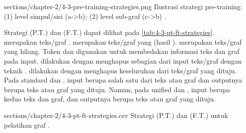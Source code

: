   {sections/chapter-2/4-3-pre-training-strategies.png}
  {Ilustrasi strategi pre-training: (1) \denoising{} level simpul/sisi (a->b); (2) \denoising{} level sub-graf (c->b) .}

Strategi \pretraining{} (P.T.) dan \finetuning{} (F.T.) dapat dilihat pada \cref{tab:4-3-pt-ft-strategies}.
 merupakan teks/graf .
 merupakan teks/graf yang  (hasil \denoising{}).
 merupakan teks/graf yang hilang.
Token  dan  digunakan untuk membedakan informasi teks dan graf pada input.
\Pretraining{} dilakukan dengan menghapus sebagian dari input teks/graf dengan teknik \denoising{}.
\Finetuning{} dilakukan dengan menghapus keseluruhan dari teks/graf yang dituju.
Pada standard \pretraining{} dan \finetuning{}, input berupa salah satu dari teks atau graf dan outputnya berupa teks atau graf yang dituju.
Namun, pada unified \pretraining{} dan \finetuning{}, input berupa kedua teks dan graf, dan outputnya berupa teks atau graf yang dituju.

  {sections/chapter-2/4-3-pt-ft-strategies.csv}
  {Strategi \pretraining{} (P.T.) dan \finetuning{} (F.T.) untuk pelatihan graf .}
